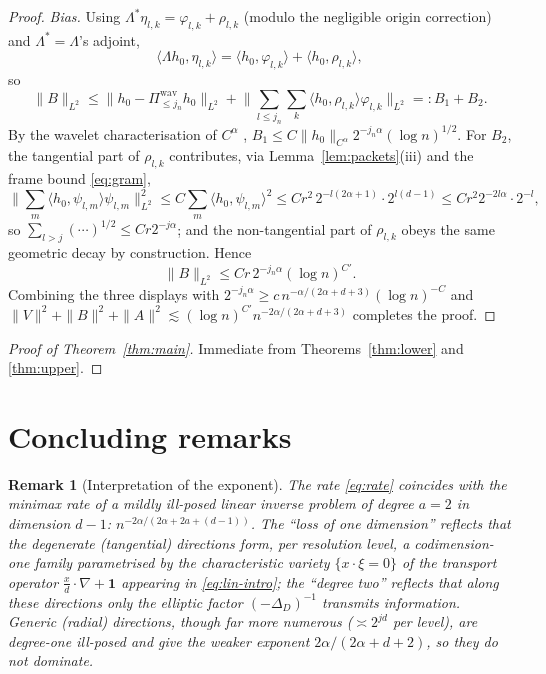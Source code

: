 \documentclass[11pt]{amsart}
\newtheorem{remark}[theorem]{Remark}
\newcommand{\1}{\mathbf{1}}
\begin{document}
\begin{proof}
\emph{Bias.} Using $\Lambda^*\eta_{l,k}=\varphi_{l,k}+\rho_{l,k}$
(modulo the negligible origin correction) and $\Lambda^*=\Lambda$'s adjoint,
\[
\langle\Lambda h_0,\eta_{l,k}\rangle
=\langle h_0,\varphi_{l,k}\rangle+\langle h_0,\rho_{l,k}\rangle,
\]
so
\[
\|B\|_{L^2}\le
\big\|h_0-\Pi_{\le j_n}^{\mathrm{wav}}h_0\big\|_{L^2}
+\Big\|\sum_{l\le j_n}\sum_k\langle h_0,\rho_{l,k}\rangle
\varphi_{l,k}\Big\|_{L^2}=:B_1+B_2 .
\]
By the wavelet characterisation of $C^\alpha$
\cite[Ch.~4]{Tri08},
$B_1\le C\|h_0\|_{C^\alpha}2^{-j_n\alpha}(\log n)^{1/2}$. For $B_2$, the
tangential part of $\rho_{l,k}$ contributes, via
Lemma~\ref{lem:packets}(iii) and the frame bound \eqref{eq:gram},
\[
\Big\|\sum_m\langle h_0,\psi_{l,m}\rangle\psi_{l,m}\Big\|_{L^2}^2
\le C\sum_m\langle h_0,\psi_{l,m}\rangle^2
\le C r^2\,2^{-l(2\alpha+1)}\cdot 2^{l(d-1)}
\le C r^2 2^{-2l\alpha}\cdot 2^{-l},
\]
so $\sum_{l>j}(\cdots)^{1/2}\le Cr2^{-j\alpha}$; and the
non-tangential part of $\rho_{l,k}$ obeys the same geometric decay by
construction. Hence
\[
\|B\|_{L^2}\le Cr\,2^{-j_n\alpha}(\log n)^{C'} .
\]
Combining the three displays with
$2^{-j_n\alpha}\ge
c\,n^{-\alpha/(2\alpha+d+3)}(\log n)^{-C}$ and
$\|V\|^2+\|B\|^2+\|A\|^2\lesssim(\log n)^{C'}n^{-2\alpha/(2\alpha+d+3)}$
completes the proof.
\end{proof}

\begin{proof}[Proof of Theorem~\ref{thm:main}]
Immediate from Theorems~\ref{thm:lower} and \ref{thm:upper}.
\end{proof}

\section{Concluding remarks}\label{sec:remarks}

\begin{remark}[Interpretation of the exponent]
The rate \eqref{eq:rate} coincides with the minimax rate of a mildly
ill-posed \emph{linear} inverse problem of degree $a=2$ in dimension $d-1$:
$n^{-2\alpha/(2\alpha+2a+(d-1))}$. The ``loss of one dimension''
reflects that the degenerate (tangential) directions form, per resolution
level, a codimension-one family parametrised by the characteristic variety
$\{x\cdot\xi=0\}$ of the transport operator $\frac{x}{d}\cdot\nabla+\1$
appearing in \eqref{eq:lin-intro}; the ``degree two'' reflects that along
these directions only the elliptic factor $(-\Delta_D)^{-1}$ transmits
information. Generic (radial) directions, though far more numerous
($\asymp2^{jd}$ per level), are degree-one ill-posed and give the weaker
exponent $2\alpha/(2\alpha+d+2)$, so they do not dominate.
\end{remark}
\end{document}

